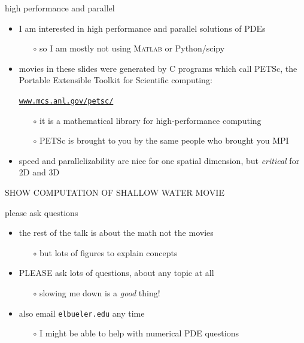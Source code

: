 \documentclass[10pt,hyperref,dvipsnames]{beamer}
\newcommand{\Matlab}{\textsc{Matlab}\xspace}
\begin{document}
\begin{frame}{high performance and parallel}

\begin{itemize}
\item I am interested in high performance and parallel solutions of PDEs
    \begin{itemize}
    \item[$\circ$] so I am mostly not using \Matlab or Python/scipy
    \end{itemize}
\item movies in these slides were generated by C programs which call PETSc, the Portable Extensible Toolkit for Scientific computing:

    \begin{center}
    \href{https://www.mcs.anl.gov/petsc/}{\texttt{www.mcs.anl.gov/petsc/}}
    \end{center}

    \begin{itemize}
    \item[$\circ$] it is a mathematical library for high-performance computing
    \item[$\circ$] PETSc is brought to you by the same people who brought you MPI
    \end{itemize}
\item speed and parallelizability are nice for one spatial dimension, but \emph{critical} for 2D and 3D
\end{itemize}

\vspace{10mm}
\begin{center}
\alert{SHOW COMPUTATION OF SHALLOW WATER MOVIE}
\end{center}

\end{frame}


\begin{frame}{please ask questions}

\begin{itemize}
\item the rest of the talk is about the math not the movies
    \begin{itemize}
    \item[$\circ$] but lots of figures to explain concepts
    \end{itemize}
\item \alert{PLEASE} ask lots of questions, about any topic at all
    \begin{itemize}
    \item[$\circ$] slowing me down is a \emph{good} thing!
    \end{itemize}
\item also email \quad \texttt{elbueler\@@alaska.edu} \quad any time
    \begin{itemize}
    \item[$\circ$] I might be able to help with numerical PDE questions
    \end{itemize}
\end{itemize}
\end{frame}
\end{document}
